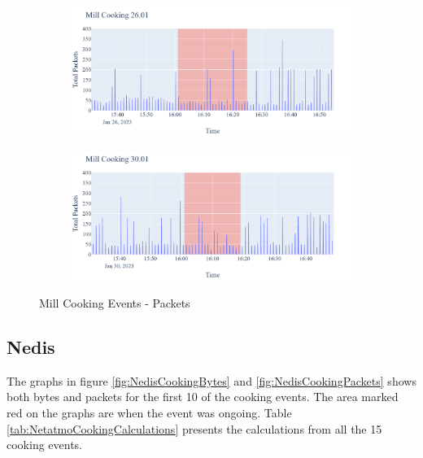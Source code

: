 \begin{figure}[H]
\begin{subfigure}[b]{0.5\textwidth}
        \centering
        \includegraphics[width=1.2\hsize]{figures/Mill_Cooking_Packets_26.01.png}
    \end{subfigure}
    \begin{subfigure}[b]{0.5\textwidth}
        \centering
        \includegraphics[width=1.2\hsize]{figures/Mill_Cooking_Packets_30.01.png}
    \end{subfigure}
    \caption{Mill Cooking Events - Packets}
    \label{fig:MillCookingPackets}
\end{figure}
\subsection{Nedis}
The graphs in figure \ref{fig:NedisCookingBytes} and \ref{fig:NedisCookingPackets} shows both bytes and packets for the first 10 of the cooking events. The area marked red on the graphs are when the event was ongoing. Table \ref{tab:NetatmoCookingCalculations} presents the calculations from all the 15 cooking events. 

